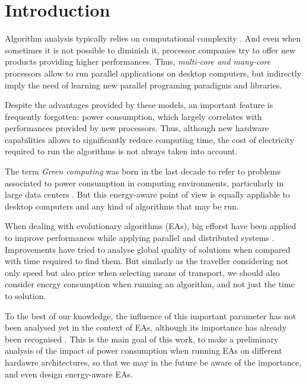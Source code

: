 \section{Introduction}

Algorithm analysis typically relies on computational complexity \cite{complexity}. And even when sometimes it is not possible to diminish it, processor companies try to offer new products providing higher performances.  Thus, \textit{multi-core and many-core} processors allow to run parallel applications on desktop computers, but indirectly imply the need of learning new parallel programing paradigms and libraries.

Despite the advantages provided by these models, an important feature is frequently forgotten:  power consumption, which largely correlates with performances provided by new processors.  Thus, although new hardware capabilities allows to significantly reduce computing time, the cost of electricity required to run the algorithms is not always taken into account.

The term \textit{Green computing} was born in the last decade to refer to problems associated to power consumption in computing environments, particularly in large data centers \cite{green-computing}.  But this energy-aware point of view is equally appliable to desktop computers and any kind of algorithms that may be run.

When dealing with evolutionary algorithms (EAs), big efforst have been applied to improve performances while applying parallel and distributed systems \cite{paba}.  Improvements have tried to analyse global quality of solutions when compared with time required to find them.  But similarly as the traveller considering not only speed but also price when selecting means of transport, we should also consider energy consumption when running an algorithm, and not just the time to solution.

To the best of our knowledge, the influence of this important parameter has not been analysed yet in the context of EAs, although its importance has already been recognised \cite{ephemeral}.  This is the main goal of this work, to make a preliminary analysis of the impact of power consumption when running EAs on different hardawre architectures, so that we may in the future be aware of the importance, and even design energy-aware EAs.
